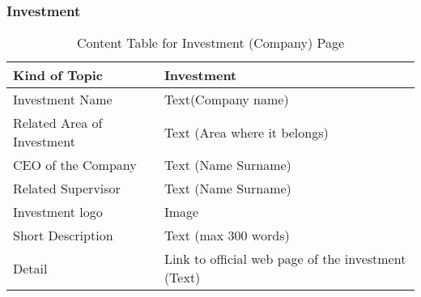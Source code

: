 \documentclass[../../DD.tex]{subfiles}
\begin{document}
    \subsubsection{Investment}
     \begin{table}[h]
    \begin{tabular}{ |l|p{}| }
    \hline
    Kind of Topic & Investment\\
    \hline
    Investment Name & Text(Company name) \\
    \hline
    Related Area of Investment& Text (Area where it belongs) \\
    \hline
    CEO of the Company & Text (Name Surname)\\
    \hline
    Related Supervisor & Text (Name Surname) \\
    \hline
   Investment logo & Image \\
    \hline
   Short Description & Text (max 300 words) \\
    \hline
   Detail & Link to official web page of the investment (Text) \\
    \hline
\end{tabular}
\caption{Content Table for Investment (Company) Page}
\end{table}
 \clearpage
\end{document}
